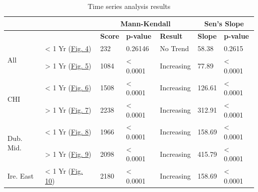 \documentclass[
  12pt,
]{article}
\begin{document}
\begin{table}[!htbp]
    \centering
    \caption{Time series analysis results}\label{tab:timeseries}
    \begin{threeparttable}
    \begin{tabular}{ll|lll|ll}
        \toprule
          & & \multicolumn{3}{c}{\bfseries Mann-Kendall} & \multicolumn{2}{c}{\bfseries Sen's Slope} \\ \hline
          
            & & \bfseries Score & \bfseries p-value & \bfseries Result & \bfseries Slope & \bfseries p-value  \\
            \midrule
            \multirow{2}{*}{All}      & < 1 Yr (\hyperref[fig:ts-overall-lt1yr]{Fig. 4}) 
                                      & 232 & 0.26146 & No Trend & 58.38 & 0.2615 \\
                                      
                                      & > 1 Yr (\hyperref[fig:ts-overall-gt1yr]{Fig. 5}) 
                                      & 1084 & < 0.0001 & Increasing & 77.89 & < 0.0001 \\ \hline
                                      
        \multirow{2}{*}{CHI}      & < 1 Yr (\hyperref[fig:ts-chi-lt1yr]{Fig. 6}) 
                                  & 1508 & < 0.0001 & Increasing & 126.61 & < 0.0001 \\
                                  
                                      & > 1 Yr (\hyperref[fig:ts-chi-gt1yr]{Fig. 7})
                                      & 2238 & < 0.0001 & Increasing & 312.91 & < 0.0001 \\ \hline
                                      
        \multirow{2}{*}{Dub. Mid.} & < 1 Yr (\hyperref[fig:ts-dm-lt1yr]{Fig. 8}) 
                                  & 1966 & < 0.0001 & Increasing & 158.69 & < 0.0001 \\
                                  
                                      & > 1 Yr (\hyperref[fig:ts-dm-gt1yr]{Fig. 9})
                                      & 2098 & < 0.0001 & Increasing & 415.79 & < 0.0001 \\ \hline
                                      
        \multirow{2}{*}{Ire. East} & < 1 Yr (\hyperref[fig:ts-ie-lt1yr]{Fig. 10}) 
                                  & 2180 & < 0.0001 & Increasing & 158.69 & < 0.0001 \\
                                  

\end{tabular}
\end{threeparttable}
\end{table}
\end{document}
